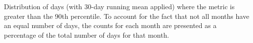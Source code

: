 \label{fig:envelope_distribution}
Distribution of days (with 30-day running mean applied) where the metric is greater than the 90th percentile. To account for the fact that not all months have an equal number of days, the counts for each month are presented as a percentage of the total number of days for that month.   